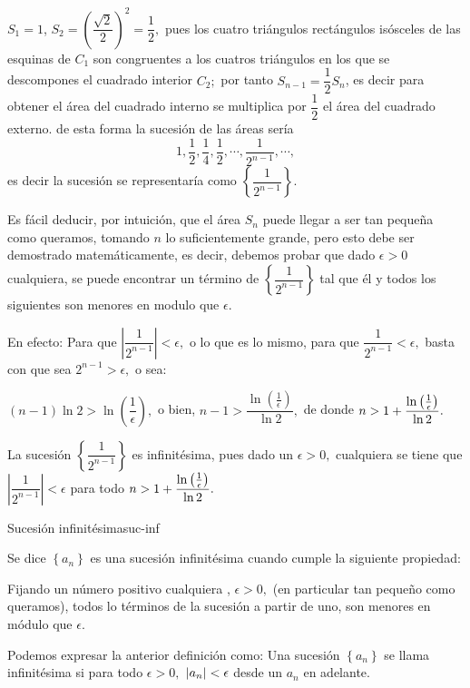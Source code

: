 \documentclass[oneside,english,spanish,2m,twoside,svgnames,x11names,HTML,twoside,12pt]{libro-matua}\usepackage[]{graphicx}\usepackage[]{color}
\newcommand{\val}[1]{\left|#1\right|}
\begin{document}
\begin{ejemplo}
$S_{1}=1$, $S_{2}=\left(\dfrac{\sqrt{2}}{2}\right)^{2}=\dfrac{1}{2},$
pues los cuatro triángulos rectángulos isósceles de las esquinas de
$C_{1}$ son congruentes a los cuatros triángulos en los que se descompones
el cuadrado interior $C_{2};$ por tanto $S_{n-1}=\dfrac{1}{2}S_{n}$,
es decir para obtener el área del cuadrado interno se multiplica por
$\dfrac{1}{2}$ el área del cuadrado externo. de esta forma la sucesión
de las áreas sería
\[
1,\dfrac{1}{2},\dfrac{1}{4},\dfrac{1}{2},\cdots,\dfrac{1}{2^{n-1}},\cdots,
\]
es decir la sucesión se representaría como $\left\{ \dfrac{1}{2^{n-1}}\right\} .$ 

Es fácil deducir, por intuición, que el área $S_{n}$ puede llegar
a ser tan pequeña como queramos, tomando $n$ lo suficientemente grande,
pero esto debe ser demostrado matemáticamente, es decir, debemos probar
que dado $\epsilon>0$ cualquiera, se puede encontrar un término de
$\left\{ \dfrac{1}{2^{n-1}}\right\} $ tal que él y todos los siguientes
son menores en modulo que $\epsilon.$

En efecto: Para que $\val{\dfrac{1}{2^{n-1}}}<\epsilon,$ o lo que
es lo mismo, para que $\dfrac{1}{2^{n-1}}<\epsilon,$ basta con que
sea $2^{n-1}>\epsilon,$ o sea: 

$\left(n-1\right)\ln2>\ln\left(\dfrac{1}{\epsilon}\right),$ o bien,
$n-1>\dfrac{\ln\left(\frac{1}{\epsilon}\right)}{\ln2},$ de donde
$n>1+\dfrac{\text{\ensuremath{\ln\left(\frac{1}{\epsilon}\right)}}}{\ln2}.$

\conclu La sucesión $\left\{ \dfrac{1}{2^{n-1}}\right\} $ es infinitésima,
pues dado un $\epsilon>0,$ cualquiera se tiene que $\val{\dfrac{1}{2^{n-1}}}<\epsilon$
para todo $n>1+\dfrac{\text{\ensuremath{\ln\left(\frac{1}{\epsilon}\right)}}}{\ln2}.$

\end{ejemplo}

\begin{defi}{Sucesión infinitésima}{suc-inf}\label{def:suc-inf}

Se dice $\left\{ a_{n}\right\} $ es una sucesión infinitésima cuando
cumple la siguiente propiedad:

Fijando un número positivo cualquiera , $\epsilon>0,$ (en particular
tan pequeño como queramos), todos lo términos de la sucesión a partir
de uno, son menores en módulo que $\epsilon.$ 

\end{defi}

Podemos expresar la anterior definición como: Una sucesión $\left\{ a_{n}\right\} $
se llama infinitésima si para todo $\epsilon>0,$ $\lvert{a_{n}}\rvert<\epsilon$
desde un $a_{n}$ en adelante.
\end{document}
